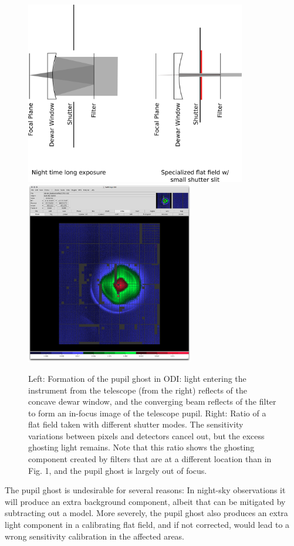 \documentclass[]{spieman}
\begin{document}
\begin{figure}
\includegraphics[height=8cm]{images/odishutterpupilghostsupression.png}
\hspace{0.5cm} \includegraphics[height=8cm]{images/odi_layeronepg.png}
	
\caption{ \label{fig_pupilghost}Left: Formation of the pupil ghost in ODI: 
    light entering the instrument from the telescope (from the right) reflects of
    the concave dewar window, and the converging beam reflects of the filter to form
    an in-focus image of the telescope pupil. Right: Ratio of a flat field taken
    with different shutter modes. The sensitivity variations between pixels and
    detectors cancel out, but the excess ghosting light remains. Note that this
    ratio shows the ghosting component created by filters that are at a different
    location than in Fig. 1, and the pupil ghost is largely out of focus.}
\end{figure}

The pupil ghost is undesirable for several reasons: In night-sky observations it
will produce an extra background component, albeit that can be mitigated by
subtracting out a model. More severely, the pupil ghost also produces an extra
light component in a calibrating flat field, and if not corrected, would lead to
a wrong sensitivity calibration in the affected areas.
\end{document}

